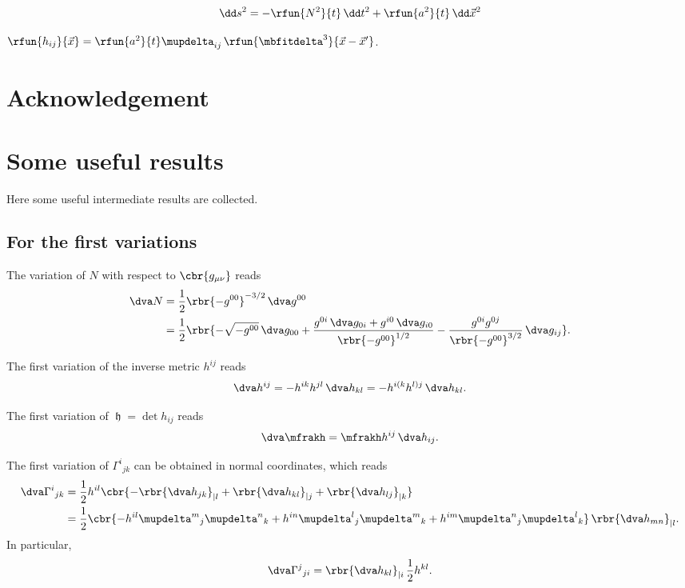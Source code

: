 \documentclass[a4paper,11pt]{article}
\begin{document}

\begin{align}
\dd s^2 = -\rfun{N^2}{t}\,\dd t^2 + \rfun{a^2}{t}\,\dd \vec{x}^2
\end{align}

$\rfun{h_{ij}}{\vec{x}} = \rfun{a^2}{t}\mupdelta_{ij}\,
\rfun{\mbfitdelta^3}{\vec{x}-\vec{x}'}$.


\section*{Acknowledgement}


\appendix

\section{Some useful results}
\label{sec:useful-results}

Here some useful intermediate results are collected.

\subsection{For the first variations}
\label{ssec:first-var}

The variation of $N$ with respect to $\cbr{g_{\mu\nu}}$ reads
\begin{align}
\dva N &= \frac{1}{2}\rbr{-g^{00}}^{-3/2}\,\dva g^{00}
\\
&= \frac{1}{2}\rbr{-\sqrt{-g^{00}}\,\dva g_{00}
+\frac{g^{0i}\,\dva g_{0i}+g^{i0}\,\dva g_{i0}}{\rbr{-g^{00}}^{1/2}}
-\frac{g^{0i}g^{0j}}{\rbr{-g^{00}}^{3/2}}\,\dva g_{ij}}.
\end{align}

The first variation of the inverse metric $h^{ij}$ reads
\begin{align}
\dva h^{ij} = -h^{ik}h^{jl}\,\dva h_{kl} = - h^{i(k}h^{l)j}\,\dva h_{kl}.
\end{align}

The first variation of $\mfrakh = \det h_{ij}$ reads
\begin{align}
\dva \mfrakh = \mfrakh h^{ij}\,\dva h_{ij}.
\end{align}

The first variation of $\Gamma^i{}_{jk}$ can be obtained in normal coordinates,
which reads
\begin{align}
\dva \Gamma^{i}{}_{jk} &= \frac{1}{2} h^{il}
\cbr{-\rbr{\dva h_{jk}}_{|l} + \rbr{\dva h_{kl}}_{|j} + \rbr{\dva h_{lj}}_{|k}}
\\
&= \frac{1}{2} \cbr{-h^{il}\mupdelta^m{}_j\mupdelta^n{}_k
+h^{in}\mupdelta^l{}_j\mupdelta^m{}_k
+h^{im}\mupdelta^n{}_j\mupdelta^l{}_k}\,\rbr{\dva h_{mn}}_{|l}.
\end{align}
In particular,
\begin{align}
\dva \Gamma^j{}_{ji} = \rbr{\dva h_{kl}}_{|i}\,\frac{1}{2}h^{kl}.
\end{align}
\end{document}
